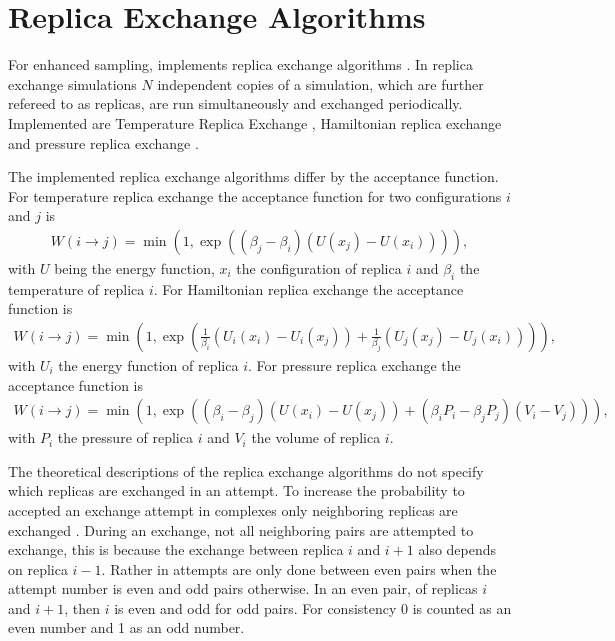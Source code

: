 \documentclass[12pt, twoside]{report}
\begin{document}
\section{Replica Exchange Algorithms}

For enhanced sampling, \complexes implements replica exchange algorithms
\cite{Swendsen1986, Bennett1976, tuckerman2010statistical}. In replica exchange
simulations \(N\) independent copies of a simulation, which are further refereed
to as replicas, are run simultaneously and exchanged periodically. Implemented
are Temperature Replica Exchange \cite{Hansmann1997}, Hamiltonian replica
exchange \cite{Bussi2014} and pressure replica exchange \cite{Okabe2001}.

The implemented replica exchange algorithms differ by the acceptance function.
For temperature replica exchange the acceptance function for two configurations
\(i\) and \(j\) is \cite{Hansmann1997}
\begin{align}
  \label{eq:ch5:REMC} W(i\rightarrow j) = \min(1, \exp\left( (\beta_j - \beta_i)
(U(x_j) - U(x_i)) \right)),
\end{align} with $U$ being the energy function, \(x_i\) the configuration of
replica \(i\) and \(\beta_i\) the temperature of replica \(i\). For Hamiltonian
replica exchange the acceptance function is \cite{Bussi2014}
\begin{align}
  \label{eq:ch5:HREX} W(i\rightarrow j) = \min\left(1, \exp\left(
\frac{1}{\beta_i}(U_i(x_i) - U_i(x_j)) + \frac{1}{\beta_j}(U_j(x_j) - U_j(x_i))
\right)\right),
\end{align} with \(U_i\) the energy function of replica \(i\). For pressure
replica exchange the acceptance function is \cite{Okabe2001}
\begin{align}
  \label{eq:ch5:MPTMC} W(i\rightarrow j) = \min\left(1, \exp\left( (\beta_i -
\beta_j) (U(x_i) - U(x_j)) + (\beta_i P_i - \beta_j P_j) (V_i -
V_j)\right)\right),
\end{align} with \(P_i\) the pressure of replica \(i\) and \(V_i\) the volume of
replica \(i\).

The theoretical descriptions of the replica exchange algorithms do not specify
which replicas are exchanged in an attempt. To increase the probability to
accepted an exchange attempt in complexes only neighboring replicas are
exchanged \cite{Bussi2014}. During an exchange, not all neighboring pairs are
attempted to exchange, this is because the exchange between replica \(i\) and
\(i+1\) also depends on replica \(i-1\). Rather in \complexes attempts are only
done between even pairs when the attempt number is even and odd pairs otherwise.
In an even pair, of replicas \(i\) and \(i+1\), then \(i\) is even and odd for
odd pairs. For consistency 0 is counted as an even number and 1 as an odd
number.
\end{document}
